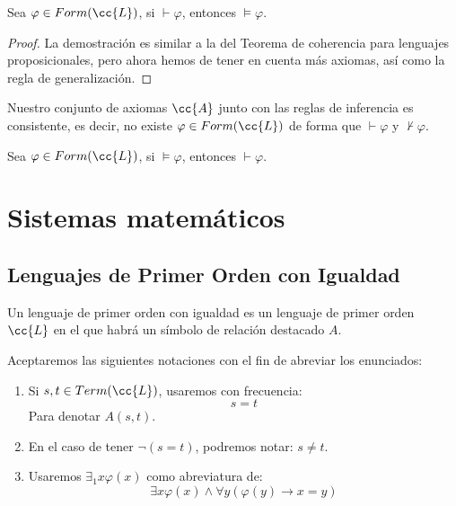 \begin{teo}[de coherencia]
    Sea $\varphi \in Form(\cc{L})$, si $\vdash \varphi$, entonces $\vDash \varphi$.
    \begin{proof}
        La demostración es similar a la del Teorema de coherencia para lenguajes proposicionales, pero ahora hemos de tener en cuenta más axiomas, así como la regla de generalización.
    \end{proof}
\end{teo}

\begin{teo}[de consistencia]
    Nuestro conjunto de axiomas $\cc{A}$ junto con las reglas de inferencia es consistente, es decir, no existe $\varphi \in Form(\cc{L})$ de forma que $\vdash \varphi$ y $\nvdash\varphi$.
\end{teo}

\begin{teo}[de adecuación]
    Sea $\varphi \in Form(\cc{L})$, si $\vDash\varphi$, entonces $\vdash \varphi$.
\end{teo}

\section{Sistemas matemáticos}
\subsection{Lenguajes de Primer Orden con Igualdad}
Un lenguaje de primer orden con igualdad es un lenguaje de primer orden $\cc{L}$ en el que habrá un símbolo de relación destacado $A$.

\begin{notacion}
    Aceptaremos las siguientes notaciones con el fin de abreviar los enunciados:
    \begin{enumerate}
        \item Si $s,t\in Term(\cc{L})$, usaremos con frecuencia:
            \begin{equation*}
                s = t
            \end{equation*}
            Para denotar $A(s,t)$.
        \item En el caso de tener $\lnot (s = t)$, podremos notar: $s\neq t$.
        \item Usaremos $\exists_1 x\varphi(x)$ como abreviatura de:
            \begin{equation*}
                \exists x\varphi(x) \land \forall y(\varphi(y) \to x=y)
            \end{equation*}
    \end{enumerate}
\end{notacion}

